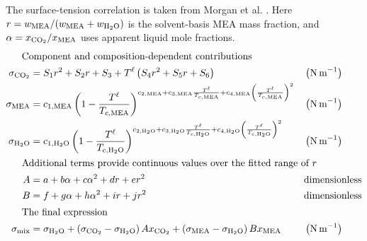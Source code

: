 The surface-tension correlation is taken from Morgan et al. \cite{Morgan2015}.
Here $r=w_{\MEA}/(w_{\MEA}+w_{\HtwoO})$ is the solvent-basis MEA mass fraction, and $\alpha=x_{\COtwo}/x_{\MEA}$ uses apparent liquid mole fractions.
\begin{align}
\shortintertext{\quad\; Component and composition-dependent contributions}
\sigma _{\COtwo} &= S_1 r^2+S_2 r+S_3+T^{\liq} \left(S_4 r^2+S_5 r+S_6\right)
&& \left(\unit{N\,m^{-1}}\right)\\
\sigma _{\MEA} &= c_{1,\MEA} \left(1-\frac{T^{\liq}}{T_{c,\MEA}}\right)^{c_{2,\MEA}+c_{3,\MEA} \frac{T^{\liq}}{T_{c,\MEA}}+c_{4,\MEA} \left(\frac{T^{\liq}}{T_{c,\MEA}}\right)^2}
&& \left(\unit{N\,m^{-1}}\right)\\
\sigma _{\HtwoO} &= c_{1,\HtwoO} \left(1-\frac{T^{\liq}}{T_{c,\HtwoO}}\right)^{c_{2,\HtwoO}+c_{3,\HtwoO} \frac{T^{\liq}}{T_{c,\HtwoO}}+c_{4,\HtwoO} \left(\frac{T^{\liq}}{T_{c,\HtwoO}}\right)^2}
&& \left(\unit{N\,m^{-1}}\right)\\
\shortintertext{\quad\; Additional terms provide continuous values over the fitted range of $r$}
A &= a+b \alpha+c {\alpha}^2+d r+e r^2
&& \text{dimensionless}\\
B &= f+g \alpha+h {\alpha}^2+i r+j r^2
&& \text{dimensionless}\\
\shortintertext{\quad\; The final expression}
\sigma _{\text{mix}} &= \sigma_{\HtwoO}+\left(\sigma_{\COtwo}-\sigma_{\HtwoO}\right) A x_{\COtwo}+\left(\sigma_{\MEA}-\sigma_{\HtwoO}\right) B x_{\MEA}
&& \left(\unit{N\,m^{-1}}\right)
\end{align}


